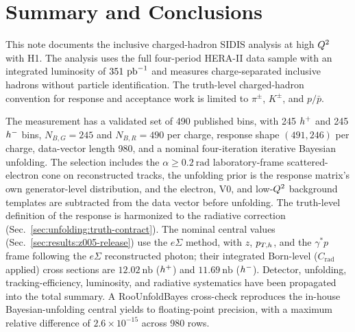 \section{Summary and Conclusions}
\label{sec:summary}

This note documents the inclusive charged-hadron SIDIS analysis at high
$Q^{2}$ with H1.  The analysis uses the full four-period HERA-II data sample with
an integrated luminosity of $351~\text{pb}^{-1}$ and measures charge-separated inclusive
hadrons without particle identification.  The truth-level charged-hadron convention for
response and acceptance work is limited to $\pi^{\pm}$, $K^{\pm}$, and $p/\bar p$.

The measurement has a validated set of 490 published bins,
with 245 $h^{+}$ and 245 $h^{-}$ bins, $N_{B,G}=245$ and $N_{B,R}=490$ per
charge, response shape $(491,246)$ per charge, data-vector length 980,
and a nominal four-iteration iterative Bayesian unfolding.  The selection
includes the $\alpha\ge0.2~\mathrm{rad}$ laboratory-frame scattered-electron
cone on reconstructed tracks, the unfolding prior is the response matrix's
own generator-level distribution, and the electron, V0, and low-$Q^{2}$
background templates are subtracted from the data vector before unfolding.
The truth-level definition of the response is harmonized to the radiative correction
(Sec.~\ref{sec:unfolding:truth-contract}).  The nominal central values
(Sec.~\ref{sec:results:z005-release}) use the $e\Sigma$ method, with
$z$, $p_{T,h}$, and the $\gamma^{*}p$ frame following the $e\Sigma$ reconstructed
photon; their integrated Born-level ($C_{\mathrm{rad}}$ applied) cross sections are
$12.02~\mathrm{nb}$ ($h^{+}$) and $11.69~\mathrm{nb}$ ($h^{-}$).
Detector, unfolding, tracking-efficiency,
luminosity, and radiative systematics have been propagated into the total
summary.  A
RooUnfoldBayes cross-check reproduces the in-house Bayesian-unfolding central yields to
floating-point precision, with a maximum relative difference of
$2.6\times10^{-15}$ across 980 rows.

